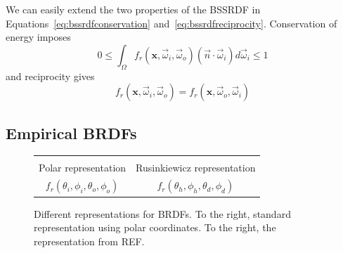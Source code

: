 We can easily extend the two properties of the BSSRDF in Equations~\ref{eq:bssrdfconservation} and~\ref{eq:bssrdfreciprocity}. Conservation of energy imposes
\begin{equation*}
0 \leq \int_\Omega f_r(\mathbf{x}, \vec{\omega}_i,  \vec{\omega}_o)  (\vec{n} \cdot \vec{\omega}_i) d\vec{\omega}_i \leq 1
\end{equation*}
and reciprocity gives
\begin{equation*}
f_r(\mathbf{x}, \vec{\omega}_i,  \vec{\omega}_o) = f_r(\mathbf{x}, \vec{\omega}_o,  \vec{\omega}_i)
\end{equation*}

\subsection{Empirical BRDFs}
\begin{figure}
\centering
\begin{tabular}{@{}c@{\hskip 1em}c@{}}
\def\svgwidth{0.45\textwidth} &  \def\svgwidth{0.45\textwidth} \\
Polar representation &  Rusinkiewicz representation \\
$f_r(\theta_i, \phi_i, \theta_o, \phi_o)$ &  $f_r(\theta_h, \phi_h, \theta_d, \phi_d)$ \\
\end{tabular}
\caption{Different representations for BRDFs. To the right, standard representation using polar coordinates. To the right, the representation from REF. } 
\label{fig:brdfrepr}
\end{figure}

